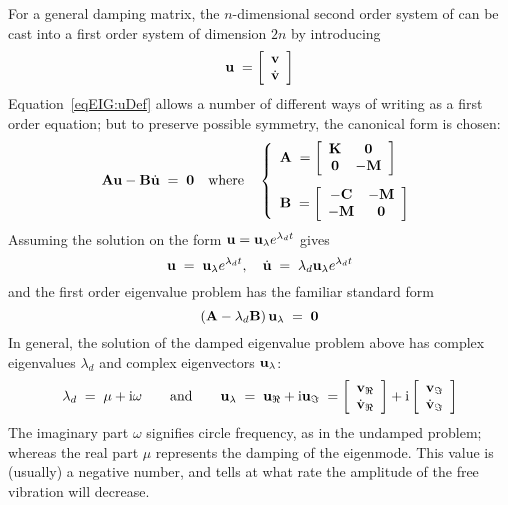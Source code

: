 For a general damping matrix, the $n$-dimensional second order system of
 can be cast into a first order system of dimension
$2n$ by introducing
%
\begin{equation}
{\bf u} \;= \left[\begin{array}{c} {\bf v} \\ \dot{\bf v} \end{array}\right]
\label{eqEIG:uDef}
\end{equation}
%
Equation~\eqref{eqEIG:uDef} allows a number of different ways of writing
 as a first order equation; but to
preserve possible symmetry, the canonical form is chosen:
%
\begin{equation}
{\bf A u} - {\bf B}\dot{\bf u} \;=\; {\bf 0} \quad\text{where}\quad
\left\{\begin{array}{l}
{\bf A} \;= \left[\begin{array}{cc} {\bf K} & {\bf 0} \\ {\bf 0} & {\bf -M}
            \end{array}\right] \\[5mm]
{\bf B} \;= \left[\begin{array}{cc} {\bf -C} & {\bf -M} \\ {\bf -M} & {\bf 0}
            \end{array}\right]
\end{array}\right.
\label{eqEIG:Canonical}
\end{equation}
%
Assuming the solution on the form ${\bf u} = {\bf u}_\lambda e^{\lambda_d t}$
gives
%
\begin{equation}
{\bf u} \;=\; {\bf u}_\lambda e^{\lambda_d t}, \quad
\dot{\bf u} \;=\; \lambda_d{\bf u}_\lambda e^{\lambda_d t}
\label{eqEIG:AssumedSol3}
\end{equation}
%
and the first order eigenvalue problem has the familiar standard form
%
\begin{equation}
\left({\bf A} - \lambda_d{\bf B}\right){\bf u}_\lambda \;=\; {\bf 0}
\label{eqEIG:FirstOrderEig}
\end{equation}
%
In general, the solution of the damped eigenvalue problem above has
complex eigenvalues $\lambda_d$ and complex eigenvectors ${\bf u}_\lambda$:
%
\begin{equation}
\lambda_d \;=\; \mu + \text{i}\omega \qquad\text{and}\qquad
{\bf u}_\lambda \;=\; {\bf u}_{\Re} + \text{i}{\bf u}_{\Im} \;=
\left[\begin{array}{c}{\bf v}_{\Re} \\ \dot{\bf v}_{\Re} \end{array}\right] +
\text{i}\left[\begin{array}{c}{\bf v}_{\Im} \\ \dot{\bf v}_{\Im} \end{array}\right]
\label{eqEIG:EigSolDamp}
\end{equation}
%
The imaginary part $\omega$ signifies circle frequency, as in the undamped
problem; whereas the real part $\mu$ represents the damping of the eigenmode.
This value is (usually) a negative number, and tells at what rate the amplitude
of the free vibration will decrease.

